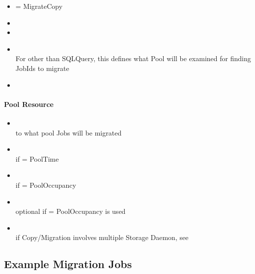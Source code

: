 \begin{itemize}
    \item {} = Migrate{\textbar}Copy
    \item {}
        \item {}
    \item {} \\
        For  other than SQLQuery, 
        this defines what Pool will be examined for finding JobIds to migrate
    \item {}
\end{itemize}

\paragraph{Pool Resource}

\begin{itemize}
    \item {} \\
        to what pool Jobs will be migrated
    \item {} \\
        if  = PoolTime
    \item {} \\
        if  = PoolOccupancy
    \item {} \\
        optional if  = PoolOccupancy is used
    \item {} \\
        if Copy/Migration involves multiple Storage Daemon, see 
\end{itemize}


\subsection{Example Migration Jobs}


